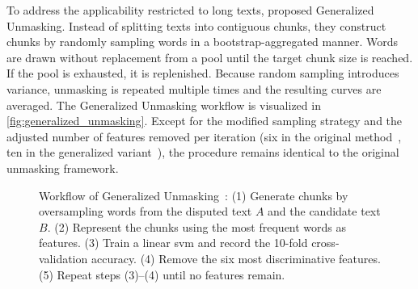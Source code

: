 To address the applicability restricted to long texts, \citet{bevendorff_generalizing_2019,bevendorff_divergence_based_2020} proposed Generalized Unmasking. 
Instead of splitting texts into contiguous chunks, they construct chunks by randomly sampling words in a bootstrap-aggregated manner. 
Words are drawn without replacement from a pool until the target chunk size is reached.
If the pool is exhausted, it is replenished. 
Because random sampling introduces variance, unmasking is repeated multiple times and the resulting curves are averaged. 
The Generalized Unmasking workflow is visualized in \autoref{fig:generalized_unmasking}. 
Except for the modified sampling strategy and the adjusted number of features removed per iteration (six in the original method~\citep{koppel_authorship_2004}, ten in the generalized variant~\citep{bevendorff_generalizing_2019}), the procedure remains identical to the original unmasking framework.

        

\begin{figure}[htbp]
    \centering
    
    \caption{Workflow of Generalized Unmasking~\citep{bevendorff_generalizing_2019}: (1) Generate chunks by oversampling words from the disputed text $A$ and the candidate text $B$. (2) Represent the chunks using the most frequent words as features. (3) Train a linear \ac{svm} and record the 10-fold cross-validation accuracy. (4) Remove the six most discriminative features. (5) Repeat steps (3)–(4) until no features remain.}
    \label{fig:generalized_unmasking}
\end{figure}

